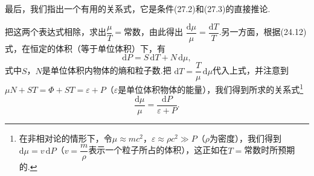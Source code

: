 最后，我们指出一个有用的关系式，它是条件(27.2)和(27.3)的直接推论.

把这两个表达式相除，求出$\dfrac{\mu}{T}=$常数，由此得出
$\dfrac{\mathrm{d}\mu}{\mu}=\dfrac{\mathrm{d}T}{T}$.另一方面，根据(24.12)式，在恒定的体积（等于单位体积）下，有
\begin{equation*}
  \mathrm{d}P=S\,\mathrm{d}T+N\,\mathrm{d}\mu,
\end{equation*}
式中$S$，$N$是单位体积内物体的熵和粒子数.把
$\mathrm{d}T=\dfrac{T}{\mu}\,\mathrm{d}\mu$代入上式，并注意到
$\mu N+ST=\varPhi+ST=\varepsilon+P$（$\varepsilon$是单位体积物体的能量），我们得到所求的关系式\footnote{在非相对论的情形下，令$\mu\approx mc^2$，$\varepsilon\approx\rho c^2\gg P$（$\rho$为密度），我们得到$\mathrm{d}\mu=v\,\mathrm{d}P$（$v=\dfrac{m}{\rho}$表示一个粒子所占的体积），这正如在$T=$常数时所预期的.}
\begin{equation}
  \frac{\mathrm{d}\mu}{\mu}
  =\frac{\mathrm{d}P}{\varepsilon+P}.
\end{equation}
